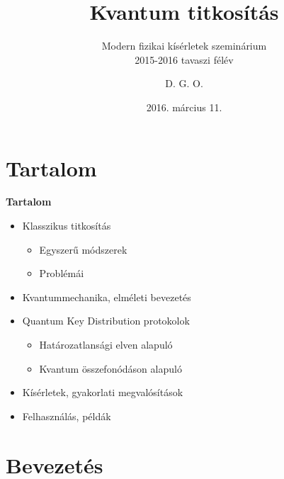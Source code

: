\documentclass{beamer}
\author{D. G. O.}
\title{Kvantum titkosítás}
\subtitle{Modern fizikai kísérletek szeminárium\\2015-2016 tavaszi félév}
\institute{Eötvös Loránd Tudományegyetem}
\date{2016. március 11.}
\begin{document}
    \small

    \begin{frame}
        \titlepage
    \end{frame}

    \section{Tartalom}

    \begin{frame}

        \center

        \textbf{Tartalom}

        \begin{itemize}
            \item Klasszikus titkosítás
            \begin{itemize}
                \item Egyszerű módszerek
                \item Problémái
            \end{itemize}
            \item Kvantummechanika, elméleti bevezetés
            \item Quantum Key Distribution protokolok
            \begin{itemize}
                \item Határozatlansági elven alapuló
                \item Kvantum összefonódáson alapuló
            \end{itemize}
            \item Kísérletek, gyakorlati megvalósítások
            \item Felhasználás, példák
        \end{itemize}
    \end{frame}

    \section{Bevezetés}
\end{document}
